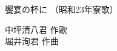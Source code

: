 \documentclass[10pt,b5j]{tarticle} %
\begin{document}
\begin{minipage}[c]{0.7\hsize} %
    \begin{center}
        {\LARGE
            饗宴の杯に %
        }
        {\small 
            （昭和23年寮歌） %
        }
    \end{center}
\end{minipage}
\begin{minipage}[c]{0.3\hsize} %
    \begin{flushright} %
        中坪清八君 作歌\\堀井洵君 作曲 %
    \end{flushright}
\end{minipage}
\end{document}
